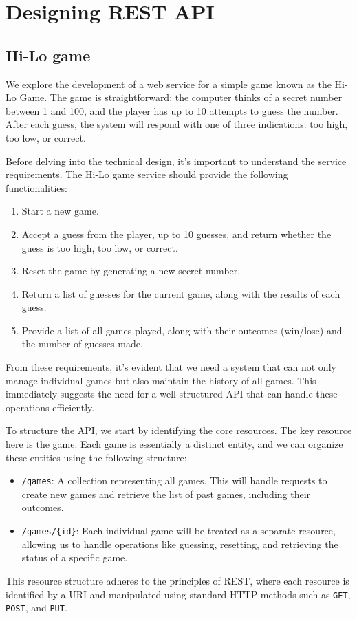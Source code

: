 \section{Designing REST API}
\subsection*{Hi-Lo game}
We explore the development of a web service for a simple game known as the Hi-Lo Game. The game is straightforward: the computer thinks of a secret number between 1 and 100, and the player has up to 10 attempts to guess the number. After each guess, the system will respond with one of three indications: too high, too low, or correct.

Before delving into the technical design, it's important to understand the service requirements. The Hi-Lo game service should provide the following functionalities:
\begin{enumerate}
    \item Start a new game.
    \item Accept a guess from the player, up to 10 guesses, and return whether the guess is too high, too low, or correct.
    \item Reset the game by generating a new secret number.
    \item Return a list of guesses for the current game, along with the results of each guess.
    \item Provide a list of all games played, along with their outcomes (win/lose) and the number of guesses made.
\end{enumerate}
From these requirements, it's evident that we need a system that can not only manage individual games but also maintain the history of all games. This immediately suggests the need for a well-structured API that can handle these operations efficiently.

To structure the API, we start by identifying the core resources. The key resource here is the game. Each game is essentially a distinct entity, and we can organize these entities using the following structure:
\begin{itemize}
    \item \texttt{/games}: A collection representing all games. This will handle requests to create new games and retrieve the list of past games, including their outcomes.
    \item \texttt{/games/\{id\}}: Each individual game will be treated as a separate resource, allowing us to handle operations like guessing, resetting, and retrieving the status of a specific game.
\end{itemize}
This resource structure adheres to the principles of REST, where each resource is identified by a URI and manipulated using standard HTTP methods such as \texttt{GET}, \texttt{POST}, and \texttt{PUT}.

